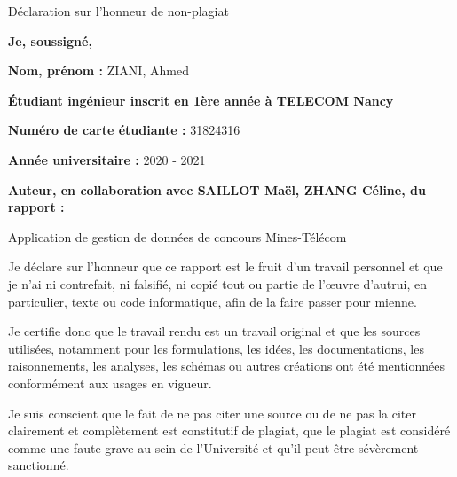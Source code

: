

%

\begin{center}
\LARGE
    Déclaration sur l'honneur de non-plagiat
\end{center}

\textbf{Je, soussigné,} 

\textbf{Nom, prénom :} ZIANI, Ahmed

\textbf{Étudiant ingénieur inscrit en 1ère année à TELECOM Nancy} 

\textbf{Numéro de carte étudiante :} 31824316

\textbf{Année universitaire :} 2020 - 2021 

\textbf{Auteur, en collaboration avec SAILLOT Maël, ZHANG Céline, du rapport : } 

\begin{center}
\Large
    Application de gestion de données de concours Mines-Télécom 
\end{center}


Je déclare sur l’honneur que ce rapport est le fruit d’un travail personnel et que je n’ai ni contrefait, ni falsifié, ni copié tout ou partie de l’œuvre d’autrui, en particulier, texte ou code informatique, afin de la faire passer pour mienne.

Je certifie donc que le travail rendu est un travail original et que les sources utilisées, notamment pour les formulations, les idées, les documentations, les raisonnements, les analyses, les schémas ou autres créations ont été mentionnées conformément aux usages en vigueur.

Je suis conscient que le fait de ne pas citer une source ou de ne pas la citer clairement et complètement est constitutif de plagiat, que le plagiat est considéré comme une faute grave au sein de l’Université et qu’il peut être sévèrement sanctionné. \\



